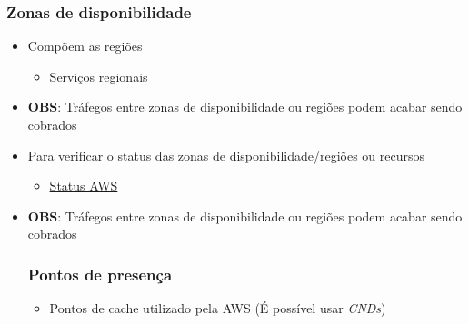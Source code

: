 \begin{frame}
	\frametitle{Zonas de disponibilidade}
	\begin{itemize}
		\item Compõem as regiões
			\begin{itemize}
				\item \href{https://aws.amazon.com/pt/about-aws/global-infrastructure/regional-product-services/}{Serviços regionais}
			\end{itemize}
		\item \textbf{OBS}: Tráfegos entre zonas de disponibilidade ou regiões podem acabar sendo cobrados
		\item Para verificar o status das zonas de disponibilidade/regiões ou recursos
			\begin{itemize}
				\item \href{http://status.aws.amazon.com/}{Status AWS}
			\end{itemize}
		\item \textbf{OBS}: Tráfegos entre zonas de disponibilidade ou regiões podem acabar sendo cobrados
	\frametitle{Pontos de presença}
	\begin{itemize}
		\item Pontos de cache utilizado pela AWS (É possível usar \textit{CNDs})
	\end{itemize}
	\end{itemize}
\end{frame}

